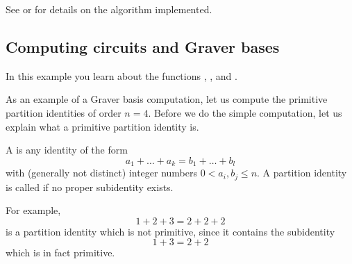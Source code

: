 See \cite[section 3.8]{deloera-hemmecke-koeppe:book} or \cite{Hemmecke:2003} for details on the algorithm implemented.

\subsection{Computing circuits and Graver bases}

In this example you learn about the functions ,
, and .

As an example of a Graver basis computation, let us compute the
primitive partition identities of order $n=4$. Before we do the
simple computation, let us explain what a primitive partition
identity is.

A  is any identity of the form
\[
a_1+\ldots+a_k=b_1+\ldots+b_l
\]
with (generally not distinct) integer numbers $0<a_i,b_j\leq n$. A
partition identity is called  if no proper
subidentity exists.

For example,
\[
1+2+3=2+2+2
\]
is a partition identity which is not primitive, since it contains
the subidentity
\[
1+3=2+2
\]
which is in fact primitive.

